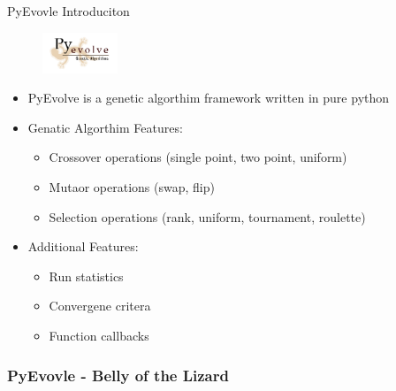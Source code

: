 \begin{frame}{PyEvovle Introduciton}
  \begin{figure}
    \centering
    \includegraphics[width=0.2\textwidth]{PyEvolveLogo.png}
  \end{figure}
  \begin{itemize}
  \small
  \item PyEvolve is a genetic algorthim framework written in pure python
  \item Genatic Algorthim Features:
    \begin{itemize}
      \tiny
      \item Crossover operations (single point, two point, uniform)
      \item Mutaor operations (swap, flip)
      \item Selection operations (rank, uniform, tournament, roulette)
    \end{itemize}
  \small
  \item Additional Features:
    \begin{itemize}
      \tiny
      \item Run statistics
      \item Convergene critera
      \item Function callbacks
    \end{itemize}
  \end{itemize}
\end{frame}
\begin{frame}[allowframebreaks]
  \frametitle{PyEvovle - Belly of the Lizard}
\end{frame}
